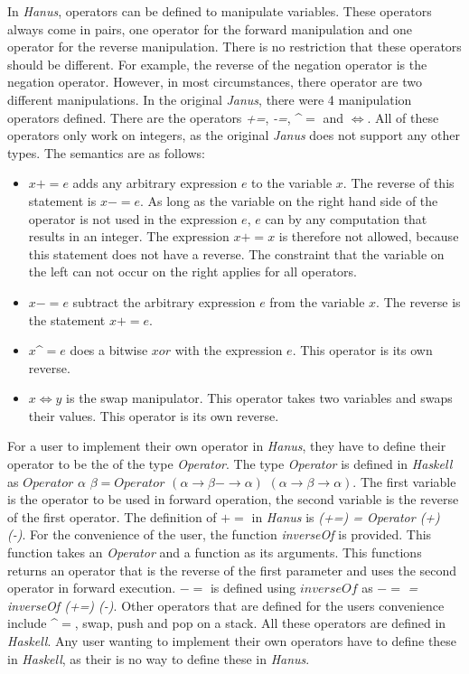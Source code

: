 \documentclass[12pt,a4paper]{article}
\begin{document}
	In \textit{Hanus}, operators can be defined to manipulate variables.  These operators always come in pairs, one operator for the forward manipulation and one operator for the reverse manipulation. There is no restriction that these operators should be different. For example, the reverse of the negation operator is the negation operator. However, in most circumstances, there operator are two different manipulations. In the original \textit{Janus}, there were 4 manipulation operators defined. There are the operators \textit{+=}, \textit{-=}, \textasciicircum$=$ and $\Leftrightarrow$. All of these operators only work on integers, as the original \textit{Janus} does not support any other types. The semantics are as follows:
	\begin{itemize}
		\item $x+=e$ adds any arbitrary expression $e$ to the variable $x$. The reverse of this statement is $x-=e$. As long as the variable on the right hand side of the operator is not used in the expression $e$, $e$ can by any computation that results in an integer. The expression $x+=x$ is therefore not allowed, because this statement does not have a reverse. The constraint that the variable on the left can not occur on the right applies for all operators.
		\item $x-=e$ subtract the arbitrary expression $e$ from the variable $x$. The reverse is the statement $x+=e$.
		\item $x$\textasciicircum$=e$ does a bitwise $xor$ with the expression $e$. This operator is its own reverse. 
		\item $x\Leftrightarrow y$ is the swap manipulator. This operator takes two variables and swaps their values. This operator is its own reverse. 
	\end{itemize}
	For a user to implement their own operator in \textit{Hanus}, they have to define their operator to be the of the type \textit{Operator}. The type \textit{Operator} is defined in \textit{Haskell} as $Operator$ $\alpha$ $\beta = Operator$ $ (\alpha \rightarrow  \beta -\rightarrow  \alpha)$ $(\alpha \rightarrow  \beta \rightarrow \alpha)$. The first variable is the operator to be used in forward operation, the second variable is the reverse of the first operator. The definition of $+=$ in \textit{Hanus} is \textit{(+=) = Operator  (+) (-)}. For the convenience of the user, the function \textit{inverseOf} is provided. This function takes an \textit{Operator} and a function as its arguments. This functions returns an operator that is the reverse of the first parameter and uses the second operator in forward execution. $-=$ is defined using $inverseOf$ as $-= $  \textit{\;= inverseOf (+=) (-)}. Other operators that are defined for the users convenience include \textasciicircum$=$, swap, push and pop on a stack. All these operators are defined in \textit{Haskell}. Any user wanting to implement their own operators have to define these in \textit{Haskell}, as their is no way to define these in \textit{Hanus}.
\end{document}
